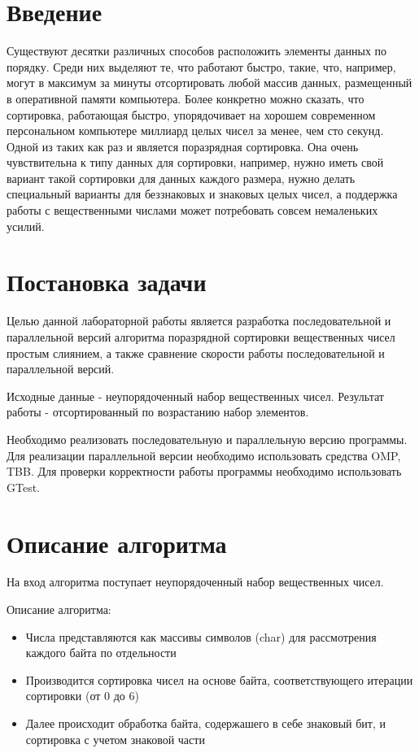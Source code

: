\documentclass{report}
\begin{document}
    \setcounter{page}{2}

    \tableofcontents
    \newpage

    \section*{Введение}
    Существуют десятки различных способов расположить элементы данных по порядку. Среди них выделяют те, что работают быстро, такие, что, например, могут в максимум за минуты отсортировать любой массив данных, размещенный в оперативной памяти компьютера. Более конкретно можно сказать, что сортировка, работающая быстро, упорядочивает на хорошем современном персональном компьютере миллиард целых чисел за менее, чем сто секунд. Одной из таких как раз и является поразрядная сортировка. Она очень чувствительна к типу данных для сортировки, например, нужно иметь свой вариант такой сортировки для данных каждого размера, нужно делать специальный варианты для беззнаковых и знаковых целых чисел, а поддержка работы с вещественными числами может потребовать совсем немаленьких усилий.
    \newpage

    \section*{Постановка задачи}
    Целью данной лабораторной работы является разработка последовательной и параллельной версий алгоритма поразрядной сортировки вещественных чисел простым слиянием, а также сравнение скорости работы последовательной и параллельной версий.
    \par Исходные данные - неупорядоченный набор вещественных чисел. Результат работы - отсортированный по возрастанию набор элементов.
    \par Необходимо реализовать последовательную и параллельную версию программы. Для реализации параллельной версии необходимо использовать средства OMP, TBB. Для проверки корректности работы программы необходимо использовать GTest.
    \newpage

    \section*{Описание алгоритма}
    На вход алгоритма поступает неупорядоченный набор вещественных чисел.
    \par Описание алгоритма:
    \begin{itemize}
        \item Числа представляются как массивы символов (char) для рассмотрения каждого байта по отдельности
        \item Производится сортировка чисел на основе байта, соответствующего итерации сортировки (от 0 до 6)
        \item Далее происходит обработка байта, содержашего в себе знаковый бит, и сортировка с учетом знаковой части

    \end{itemize}
\end{document}
